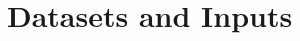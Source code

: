 \documentclass[10pt, a4paper, twocolumn]{article} %
\begin{document}





\section{Datasets and Inputs}\label{sec:3} %

\end{document}
